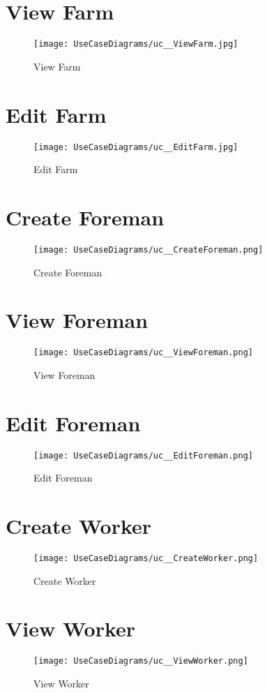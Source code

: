 \documentclass[11pt,fleqn]{book} %
\begin{document}
	\section{View Farm}
	\begin{figure}
		\texttt{[image: UseCaseDiagrams/uc\_\_ViewFarm.jpg]}
		\caption{View Farm}
	\end{figure}
	
	\section{Edit Farm}
	\begin{figure}
		\texttt{[image: UseCaseDiagrams/uc\_\_EditFarm.jpg]}
		\caption{Edit Farm}
	\end{figure}
	
	\section{Create Foreman}
	\begin{figure}
		\texttt{[image: UseCaseDiagrams/uc\_\_CreateForeman.png]}
		\caption{Create Foreman}
	\end{figure}
	
	\section{View Foreman}
	\begin{figure}
		\texttt{[image: UseCaseDiagrams/uc\_\_ViewForeman.png]}
		\caption{View Foreman}
	\end{figure}
	
	\section{Edit Foreman}
	\begin{figure}
		\texttt{[image: UseCaseDiagrams/uc\_\_EditForeman.png]}
		\caption{Edit Foreman}
	\end{figure}
	
	\section{Create Worker}
	\begin{figure}
		\texttt{[image: UseCaseDiagrams/uc\_\_CreateWorker.png]}
		\caption{Create Worker}
	\end{figure}
	
	\section{View Worker}
	\begin{figure}
		\texttt{[image: UseCaseDiagrams/uc\_\_ViewWorker.png]}
		\caption{View Worker}
	\end{figure}
	
\end{document}
